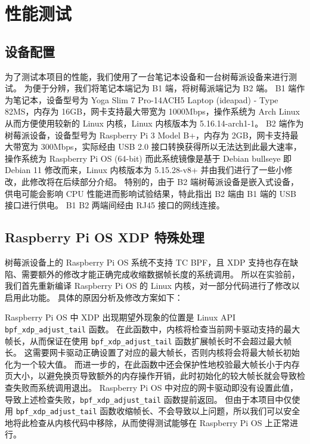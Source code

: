 \section{性能测试}

\subsection{设备配置}

为了测试本项目的性能，我们使用了一台笔记本设备和一台树莓派设备来进行测试。
为便于分辨，我们将笔记本端记为 B1 端，将树莓派端记为 B2 端。
B1 端作为笔记本，设备型号为 Yoga Slim 7 Pro-14ACH5 Laptop (ideapad) - Type 82MS，内存为 16GB，网卡支持最大带宽为 1000Mbps，操作系统为 Arch Linux 从而方便使用较新的 Linux 内核，Linux 内核版本为 5.16.14-arch1-1。
B2 端作为树莓派设备，设备型号为 Raspberry Pi 3 Model B+，内存为 2GB，网卡支持最大带宽为 300Mbps，实际经由 USB 2.0 接口转换获得所以无法达到此最大速率，操作系统为 Raspberry Pi OS (64-bit) 而此系统镜像是基于 Debian bullseye 即 Debian 11 修改而来，Linux 内核版本为 5.15.28-v8+ 并由我们进行了一些小修改，此修改将在后续部分介绍。
特别的，由于 B2 端树莓派设备是嵌入式设备，供电可能会影响 CPU 性能进而影响试验结果，特此指出 B2 端由 B1 端的 USB 接口进行供电。
B1 B2 两端间经由 RJ45 接口的网线连接。

\subsection{Raspberry Pi OS XDP 特殊处理}

树莓派设备上的 Raspberry Pi OS 系统不支持 TC BPF，且 XDP 支持也存在缺陷、需要额外的修改才能正确完成收缩数据帧长度的系统调用。
所以在实验前，我们首先重新编译 Raspberry Pi OS 的 Linux 内核，对一部分代码进行了修改以启用此功能。
具体的原因分析及修改方案如下：

Raspberry Pi OS 中 XDP 出现期望外现象的位置是 Linux API \texttt{bpf\_xdp\_adjust\_tail} 函数。
在此函数中，内核将检查当前网卡驱动支持的最大帧长，从而保证在使用 \texttt{bpf\_xdp\_adjust\_tail} 函数扩展帧长时不会超过最大帧长。
这需要网卡驱动正确设置了对应的最大帧长，否则内核将会将最大帧长初始化为一个较大值。
而进一步的，在此函数中还会保护性地校验最大帧长小于内存页大小，以避免换页导致额外的内存操作开销，此时初始化的较大帧长就会导致检查失败而系统调用退出。
Raspberry Pi OS 中对应的网卡驱动即没有设置此值，导致上述检查失败，\texttt{bpf\_xdp\_adjust\_tail} 函数提前返回。
但由于本项目中仅使用 \texttt{bpf\_xdp\_adjust\_tail} 函数收缩帧长、不会导致以上问题，所以我们可以安全地将此检查从内核代码中移除，从而使得测试能够在 Raspberry Pi OS 上正常进行。

